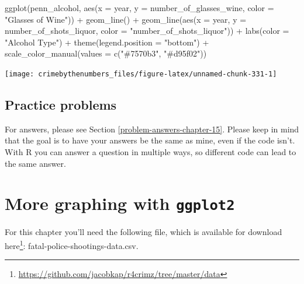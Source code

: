 \documentclass[
]{krantz}
\makeatletter
\newenvironment{Shaded}{\begin{snugshade}}{\end{snugshade}}
\newcommand{\AttributeTok}[1]{\textcolor[rgb]{0.61,0.61,0.61}{#1}}
\newcommand{\FunctionTok}[1]{\textcolor[rgb]{0,0,0}{#1}}
\newcommand{\NormalTok}[1]{#1}
\newcommand{\SpecialCharTok}[1]{\textcolor[rgb]{0,0,0}{#1}}
\newcommand{\StringTok}[1]{\textcolor[rgb]{0.5,0.5,0.5}{#1}}
\renewcommand{\href}[2]{#2\footnote{\url{#1}}}
\newenvironment{kframe}{%
\medskip{}
\setlength{\fboxsep}{.8em}
 \def\at@end@of@kframe{}%
 \ifinner\ifhmode%
  \def\at@end@of@kframe{\end{minipage}}%
  \begin{minipage}{\columnwidth}%
 \fi\fi%
 \def\FrameCommand##1{\hskip\@totalleftmargin \hskip-\fboxsep
 \colorbox{shadecolor}{##1}\hskip-\fboxsep
     \hskip-\linewidth \hskip-\@totalleftmargin \hskip\columnwidth}%
 \MakeFramed {\advance\hsize-\width
   \@totalleftmargin\z@ \linewidth\hsize
   \@setminipage}}%
 {\par\unskip\endMakeFramed%
 \at@end@of@kframe}
\renewenvironment{Shaded}{\begin{kframe}}{\end{kframe}}
\makeatother
\begin{document}
\begin{Shaded}
\begin{Highlighting}[]
\FunctionTok{ggplot}\NormalTok{(penn\_alcohol, }\FunctionTok{aes}\NormalTok{(}\AttributeTok{x =}\NormalTok{ year, }\AttributeTok{y =}\NormalTok{ number\_of\_glasses\_wine,}
                         \AttributeTok{color =} \StringTok{"Glasses of Wine"}\NormalTok{)) }\SpecialCharTok{+}
  \FunctionTok{geom\_line}\NormalTok{() }\SpecialCharTok{+}
  \FunctionTok{geom\_line}\NormalTok{(}\FunctionTok{aes}\NormalTok{(}\AttributeTok{x =}\NormalTok{ year, }\AttributeTok{y =}\NormalTok{ number\_of\_shots\_liquor,}
                \AttributeTok{color =} \StringTok{"number\_of\_shots\_liquor"}\NormalTok{)) }\SpecialCharTok{+}
  \FunctionTok{labs}\NormalTok{(}\AttributeTok{color =} \StringTok{"Alcohol Type"}\NormalTok{) }\SpecialCharTok{+}
  \FunctionTok{theme}\NormalTok{(}\AttributeTok{legend.position =} \StringTok{"bottom"}\NormalTok{) }\SpecialCharTok{+}
  \FunctionTok{scale\_color\_manual}\NormalTok{(}\AttributeTok{values =} \FunctionTok{c}\NormalTok{(}\StringTok{"\#7570b3"}\NormalTok{, }\StringTok{"\#d95f02"}\NormalTok{))}
\end{Highlighting}
\end{Shaded}

\begin{center}\texttt{[image: crimebythenumbers\_files/figure-latex/unnamed-chunk-331-1]} \end{center}

\hypertarget{practice-problems-8}{%
\section{Practice problems}\label{practice-problems-8}}

For answers, please see Section \ref{problem-answers-chapter-15}. Please keep in mind that the goal is to have your answers be the same as mine, even if the code isn't. With R you can answer a question in multiple ways, so different code can lead to the same answer.

\hypertarget{ois-graphs}{%
\chapter{\texorpdfstring{More graphing with \texttt{ggplot2}}{More graphing with ggplot2}}\label{ois-graphs}}

For this chapter you'll need the following file, which is available for download \href{https://github.com/jacobkap/r4crimz/tree/master/data}{here}: fatal-police-shootings-data.csv.
\end{document}
